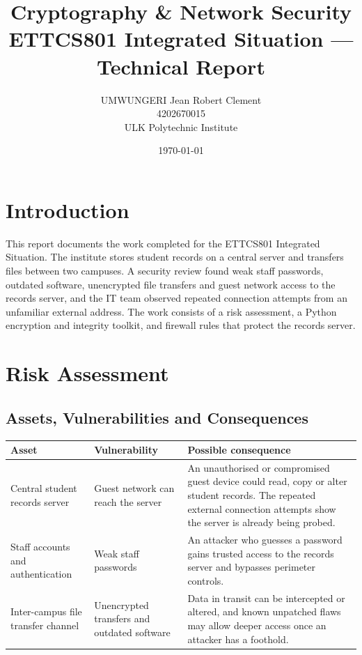 \documentclass[11pt]{article}
\title{Cryptography \& Network Security \\ \large ETTCS801 Integrated Situation --- Technical Report}
\author{UMWUNGERI Jean Robert Clement \\{} 4202670015 \\{} ULK Polytechnic Institute}
\date{\today}
\begin{document}
\maketitle
\tableofcontents
\newpage

\section{Introduction}
This report documents the work completed for the ETTCS801 Integrated Situation. The institute stores student records on a central server and transfers files between two campuses. A security review found weak staff passwords, outdated software, unencrypted file transfers and guest network access to the records server, and the IT team observed repeated connection attempts from an unfamiliar external address. The work consists of a risk assessment, a Python encryption and integrity toolkit, and firewall rules that protect the records server.

\section{Risk Assessment}
\label{sec:risk}

\subsection{Assets, Vulnerabilities and Consequences}
\begin{longtable}{p{3.2cm}p{4cm}p{7cm}}
\toprule
Asset & Vulnerability & Possible consequence \\
\midrule
\endhead
Central student records server & Guest network can reach the server & An unauthorised or compromised guest device could read, copy or alter student records. The repeated external connection attempts show the server is already being probed. \\
Staff accounts and authentication & Weak staff passwords & An attacker who guesses a password gains trusted access to the records server and bypasses perimeter controls. \\
Inter-campus file transfer channel & Unencrypted transfers and outdated software & Data in transit can be intercepted or altered, and known unpatched flaws may allow deeper access once an attacker has a foothold. \\
\bottomrule
\end{longtable}
\end{document}
